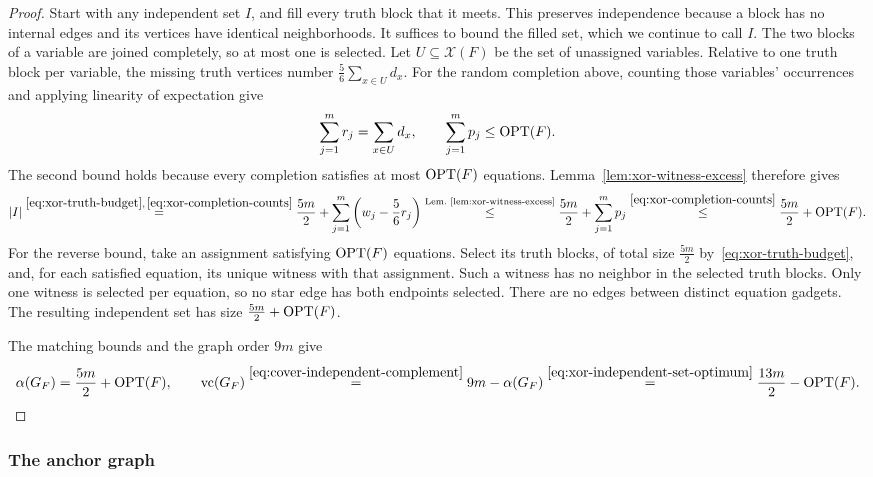 \begin{proof}
Start with any independent set $I$, and fill every truth block that
it meets. This preserves independence because a block has no internal
edges and its vertices have identical neighborhoods. It suffices to
bound the filled set, which we continue to call $I$. The two blocks
of a variable are joined completely, so at most one is selected.
Let $U\subseteq\mathcal X(F)$ be the set of unassigned variables.
Relative to one truth block per variable, the missing truth vertices
number $\frac56\sum_{x\in U}d_x$.
For the random completion above, counting those variables' occurrences
and applying linearity of expectation give
\begin{equation}\label{eq:xor-completion-counts}
 \sum_{j=1}^{m}r_j=\sum_{x\in U}d_x,\qquad
 \sum_{j=1}^{m}p_j\leq\operatorname{OPT}(F).
\end{equation}
The second bound holds because every completion satisfies at most
$\operatorname{OPT}(F)$ equations.
Lemma~\ref{lem:xor-witness-excess} therefore gives
\[
 |I|\overset{\eqref{eq:xor-truth-budget},\,\eqref{eq:xor-completion-counts}}{=}
       \frac{5m}{2}+\sum_{j=1}^{m}\left(w_j-\frac56r_j\right)
 \overset{\text{Lem.~\ref{lem:xor-witness-excess}}}{\le}
       \frac{5m}{2}+\sum_{j=1}^{m}p_j
 \overset{\eqref{eq:xor-completion-counts}}{\le}
       \frac{5m}{2}+\operatorname{OPT}(F).
\]
For the reverse bound, take an assignment satisfying $\operatorname{OPT}(F)$
equations. Select its truth blocks, of total size $\frac{5m}{2}$
by~\eqref{eq:xor-truth-budget}, and, for each
satisfied equation, its unique witness with that assignment. Such a
witness has no neighbor in the selected truth blocks. Only one witness
is selected per equation, so no star edge has both endpoints selected.
There are no edges between distinct equation gadgets. The resulting
independent set has size $\frac{5m}{2}+\operatorname{OPT}(F)$.

The matching bounds and the graph order $9m$ give
\begin{equation}\label{eq:xor-independent-set-optimum}
 \alpha(G_F)=\frac{5m}{2}+\operatorname{OPT}(F),\qquad \operatorname{vc}(G_F)
 \overset{\eqref{eq:cover-independent-complement}}{=}9m-\alpha(G_F)
 \overset{\eqref{eq:xor-independent-set-optimum}}{=}
 \frac{13m}{2}-\operatorname{OPT}(F).
\end{equation}
\end{proof}

\subsubsection{The anchor graph}
\label{subsubsec:anchor-graph}

